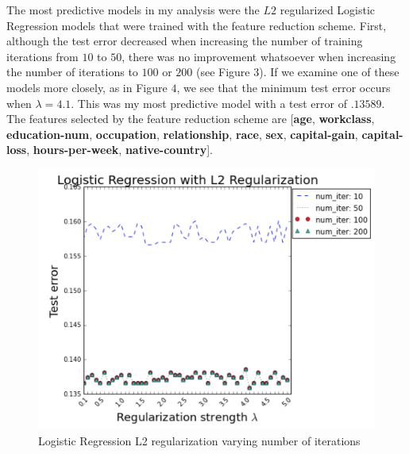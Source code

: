 \documentclass[11pt, oneside]{article}   	%
\begin{document}
The most predictive models in my analysis were the $L2$ regularized Logistic Regression models that were trained with the feature reduction scheme. First, although the test error decreased when increasing the number of training iterations from $10$ to $50$, there was no improvement whatsoever when increasing the number of iterations to $100$ or $200$ (see Figure $3$). If we examine one of these models more closely, as in Figure $4$, we see that the minimum test error occurs when $ \lambda =  4.1$. This was my most predictive model with a test error of $.13589$.  The features selected by the feature reduction scheme are [\textbf{age}, \textbf{workclass}, \textbf{education-num}, \textbf{occupation}, \textbf{relationship}, \textbf{race}, \textbf{sex}, \textbf{capital-gain}, \textbf{capital-loss}, \textbf{hours-per-week}, \textbf{native-country}].

\begin{figure}[H]
\caption{Logistic Regression L2 regularization varying number of iterations}
\begin{center}
  \includegraphics[scale=.6]{logistic_regression_l2_num_iter}
\end{center}
\end{figure}
\end{document}
